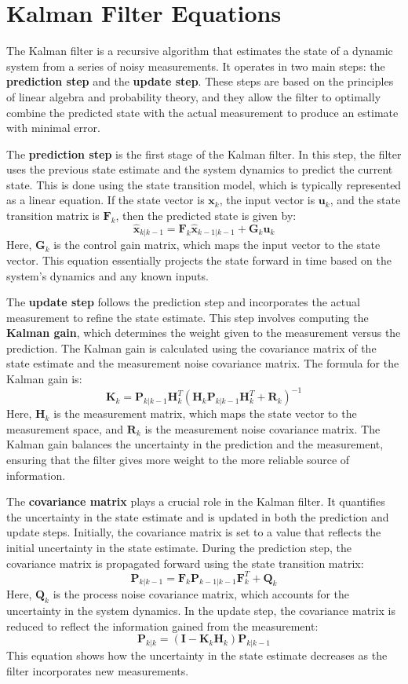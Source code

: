 \documentclass[11pt,a4paper]{article}
\newcommand{\term}[1]{\textbf{\color{lnblue!85!black}#1}}
\providecommand{\vect}[1]{\bm{#1}}
\begin{document}
\section{Kalman Filter Equations}

The Kalman filter is a recursive algorithm that estimates the state of a dynamic system from a series of noisy measurements. It operates in two main steps: the \term{prediction step} and the \term{update step}. These steps are based on the principles of linear algebra and probability theory, and they allow the filter to optimally combine the predicted state with the actual measurement to produce an estimate with minimal error.

The \term{prediction step} is the first stage of the Kalman filter. In this step, the filter uses the previous state estimate and the system dynamics to predict the current state. This is done using the state transition model, which is typically represented as a linear equation. If the state vector is $\vect{x}_{k}$, the input vector is $\vect{u}_{k}$, and the state transition matrix is $\vect{F}_{k}$, then the predicted state is given by:
\[
\vect{\hat{x}}_{k|k-1} = \vect{F}_{k} \vect{\hat{x}}_{k-1|k-1} + \vect{G}_{k} \vect{u}_{k}
\]
Here, $\vect{G}_{k}$ is the control gain matrix, which maps the input vector to the state vector. This equation essentially projects the state forward in time based on the system's dynamics and any known inputs.

The \term{update step} follows the prediction step and incorporates the actual measurement to refine the state estimate. This step involves computing the \term{Kalman gain}, which determines the weight given to the measurement versus the prediction. The Kalman gain is calculated using the covariance matrix of the state estimate and the measurement noise covariance matrix. The formula for the Kalman gain is:
\[
\vect{K}_{k} = \vect{P}_{k|k-1} \vect{H}_{k}^T (\vect{H}_{k} \vect{P}_{k|k-1} \vect{H}_{k}^T + \vect{R}_{k})^{-1}
\]
Here, $\vect{H}_{k}$ is the measurement matrix, which maps the state vector to the measurement space, and $\vect{R}_{k}$ is the measurement noise covariance matrix. The Kalman gain balances the uncertainty in the prediction and the measurement, ensuring that the filter gives more weight to the more reliable source of information.

The \term{covariance matrix} plays a crucial role in the Kalman filter. It quantifies the uncertainty in the state estimate and is updated in both the prediction and update steps. Initially, the covariance matrix is set to a value that reflects the initial uncertainty in the state estimate. During the prediction step, the covariance matrix is propagated forward using the state transition matrix:
\[
\vect{P}_{k|k-1} = \vect{F}_{k} \vect{P}_{k-1|k-1} \vect{F}_{k}^T + \vect{Q}_{k}
\]
Here, $\vect{Q}_{k}$ is the process noise covariance matrix, which accounts for the uncertainty in the system dynamics. In the update step, the covariance matrix is reduced to reflect the information gained from the measurement:
\[
\vect{P}_{k|k} = (\vect{I} - \vect{K}_{k} \vect{H}_{k}) \vect{P}_{k|k-1}
\]
This equation shows how the uncertainty in the state estimate decreases as the filter incorporates new measurements.
\end{document}
